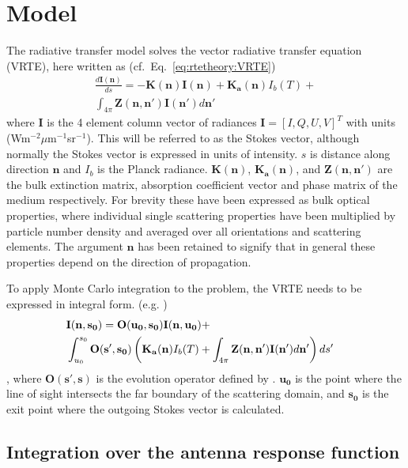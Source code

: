 \section{Model}
 \label{sec:montecarlo:model}
 The radiative transfer model solves the vector radiative transfer equation
 (VRTE), here written as (cf.\ Eq.~\ref{eq:rtetheory:VRTE})
\begin{eqnarray}
\frac{d\mathbf{I(n)}}{ds}=-\mathbf{K(n)I(n)} +
\mathbf{K_a(n)}I_b(T) +\nonumber\\
\int_{4\pi}\mathbf{Z(n,n')I(n')}d\mathbf{n'}
\label{vrte}
\end{eqnarray}
where $\mathbf{I}$ is the 4 element column vector of radiances
$\mathbf{I}=\left[I,Q,U,V\right]^T$ with units
(Wm$^{-2}\mu$m$^{-1}$sr$^{-1}$). This will be referred to as the
Stokes vector, although normally the Stokes vector is expressed in
units of intensity.  $s$ is distance along direction $\mathbf{n}$ and
$I_b$ is the Planck radiance. $\mathbf{K(n)}$, $\mathbf{K_a(n)}$,
and $\mathbf{Z(n,n')}$ are the bulk extinction matrix, absorption
coefficient vector and phase matrix of the medium respectively.  For
 brevity these have been expressed as bulk optical
properties, where individual single scattering properties have been
multiplied by particle number density and averaged over all
orientations and scattering elements. The argument $\mathbf{n}$ has been
retained to signify that in general these properties depend on the
direction of propagation. 

To apply Monte Carlo integration to the problem, the VRTE needs to be expressed
in integral form. (e.g. \cite{hochstadt:64})
\begin{eqnarray}
\lefteqn{\mathbf{I(n,s_0)}=\mathbf{O(u_0,s_0)I(n,u_0)}+}\nonumber\\
& \int_{u_0}^{s_0}\mathbf{O(s',s_0)}\left(\mathbf{K_a(n)}I_b(T)
+\int_{4\pi}\mathbf{Z(n,n')}\mathbf{I(n')}d\mathbf{n'}\right)ds'\nonumber
\end{eqnarray}
\begin{equation}
\label{intVRTE}
\end{equation}
, where $\mathbf{O(s',s)}$ is the evolution operator defined by
\cite{landi:85}. $\mathbf{u_0}$ is the point where the line of sight intersects
the far boundary of the scattering domain, and $\mathbf{s_0}$ is the
exit point where the outgoing Stokes vector is calculated.

\subsection{Integration over the antenna response function}

